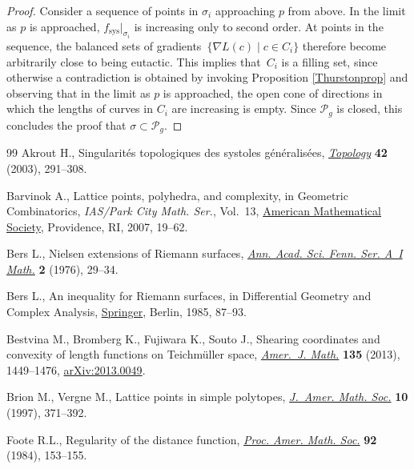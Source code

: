 \documentclass[11pt]{article}
\numberwithin{equation}{section}
\numberwithin{equation}{section}
\begin{document}
\begin{proof}
Consider a sequence of points in $\sigma_{i}$ approaching $p$ from above. In the limit as $p$ is approached, $f_{\mathrm{sys}}|_{\sigma_{i}}$ is increasing only to second order. At points in the sequence, the balanced sets of gradients~$\{\nabla L(c) \mid c\in C_{i}\}$ therefore become arbitrarily close to being eutactic. This implies that~$C_{i}$ is a filling set, since otherwise a contradiction is obtained by invoking Proposition \ref{Thurstonprop} and observing that in the limit as $p$ is approached, the open cone of directions in which the lengths of curves in $C_{i}$ are increasing is empty. Since $\mathcal{P}_{g}$ is closed, this concludes the proof that $\sigma\subset \mathcal{P}_{g}$.
\end{proof}
\begin{thebibliography}{99}
Akrout H., Singularit\'es topologiques des systoles g\'en\'eralis\'ees,
 \href{https://doi.org/10.1016/S0040-9383(01)00024-6}{\textit{Topology}} \textbf{42} (2003), 291--308.

Barvinok A., Lattice points, polyhedra, and complexity, in Geometric
 {C}ombinatorics, \textit{IAS/Park City Math. Ser.}, Vol.~13, \href{https://doi.org/10.1090/pcms/013/02}{American
 Mathematical Society}, Providence, RI, 2007, 19--62.

Bers L., Nielsen extensions of {R}iemann surfaces, \href{https://doi.org/10.5186/aasfm.1976.0205}{\textit{Ann. Acad. Sci.
 Fenn. Ser. A~I Math.}} \textbf{2} (1976), 29--34.

Bers L., An inequality for {R}iemann surfaces, in Differential {G}eometry and
 {C}omplex {A}nalysis, \href{https://doi.org/10.1007/978-3-642-69828-6_7}{Springer}, Berlin, 1985, 87--93.

Bestvina M., Bromberg K., Fujiwara K., Souto J., Shearing coordinates and
 convexity of length functions on {T}eichm\"uller space, \href{https://doi.org/10.1353/ajm.2013.0049}{\textit{Amer.~J.
 Math.}} \textbf{135} (2013), 1449--1476, \href{https://arxiv.org/abs/2013.0049}{arXiv:2013.0049}.

Brion M., Vergne M., Lattice points in simple polytopes, \href{https://doi.org/10.1090/S0894-0347-97-00229-4}{\textit{J.~Amer. Math.
 Soc.}} \textbf{10} (1997), 371--392.

Foote R.L., Regularity of the distance function, \href{https://doi.org/10.2307/2045171}{\textit{Proc. Amer. Math.
 Soc.}} \textbf{92} (1984), 153--155.


\end{thebibliography}
\end{document}
